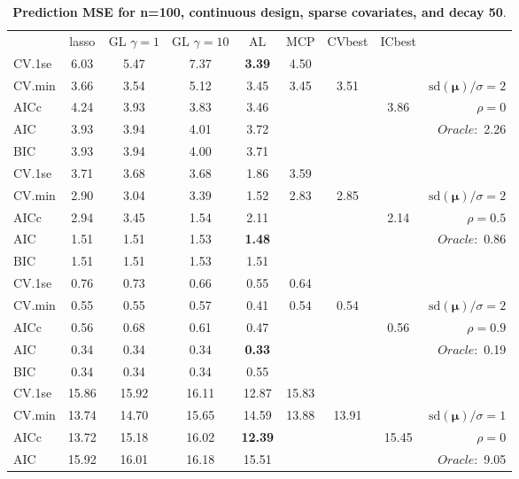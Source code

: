 \clearpage
\begin{table}\vspace{-.5cm}
\caption[l]{ { \bf Prediction MSE for n=100, continuous design, 
sparse covariates, and  decay  50}.}
\vspace{-.5cm}
\footnotesize{}
\begin{center}
\begin{tabular}{l*{7}{c}|r}
 & lasso & GL $\gamma=1$ & GL $\gamma=10$ & AL & MCP  & CVbest & ICbest  \\
\cline{1-9}
CV.1se & 6.03 & 5.47 & 7.37 & {\bf 3.39} & 4.50 & & & \\
CV.min & 3.66 & 3.54 & 5.12 & 3.45 & 3.45 & 3.51 & & $\mathrm{sd}(\mathbf{\mu})/\sigma=2$ \\
AICc & 4.24 & 3.93 & 3.83 & 3.46 & & & 3.86 &  $\rho=0$ \\
AIC & 3.93 & 3.94 & 4.01 & 3.72 & & & &  \multirow{2}{*}{$Oracle: $ 2.26} \\
BIC & 3.93 & 3.94 & 4.00 & 3.71 & & & &  \\
 \hline 
CV.1se & 3.71 & 3.68 & 3.68 & 1.86 & 3.59 & & & \\
CV.min & 2.90 & 3.04 & 3.39 & 1.52 & 2.83 & 2.85 & & $\mathrm{sd}(\mathbf{\mu})/\sigma=2$ \\
AICc & 2.94 & 3.45 & 1.54 & 2.11 & & & 2.14 &  $\rho=0.5$ \\
AIC & 1.51 & 1.51 & 1.53 & {\bf 1.48} & & & &  \multirow{2}{*}{$Oracle: $ 0.86} \\
BIC & 1.51 & 1.51 & 1.53 & 1.51 & & & &  \\
 \hline 
CV.1se & 0.76 & 0.73 & 0.66 & 0.55 & 0.64 & & & \\
CV.min & 0.55 & 0.55 & 0.57 & 0.41 & 0.54 & 0.54 & & $\mathrm{sd}(\mathbf{\mu})/\sigma=2$ \\
AICc & 0.56 & 0.68 & 0.61 & 0.47 & & & 0.56 &  $\rho=0.9$ \\
AIC & 0.34 & 0.34 & 0.34 & {\bf 0.33} & & & &  \multirow{2}{*}{$Oracle: $ 0.19} \\
BIC & 0.34 & 0.34 & 0.34 & 0.55 & & & &  \\
 \hline 
CV.1se & 15.86 & 15.92 & 16.11 & 12.87 & 15.83 & & & \\
CV.min & 13.74 & 14.70 & 15.65 & 14.59 & 13.88 & 13.91 & & $\mathrm{sd}(\mathbf{\mu})/\sigma=1$ \\
AICc & 13.72 & 15.18 & 16.02 & {\bf 12.39} & & & 15.45 &  $\rho=0$ \\
AIC & 15.92 & 16.01 & 16.18 & 15.51 & & & &  \multirow{2}{*}{$Oracle: $ 9.05} \\

\end{tabular}
\end{center}
\end{table}
